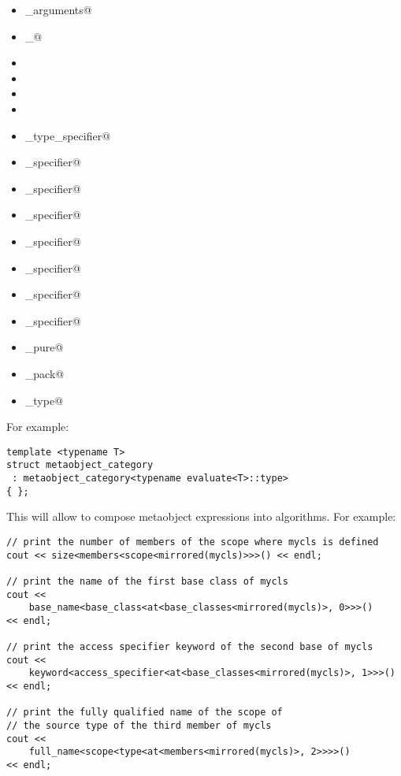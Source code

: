 \begin{minipage}[t]{0.5\textwidth}
\begin{itemize}
\item \verb@template_arguments@
\item \verb@template_@
\item \verb@exceptions@
\item \verb@instantiation@
\item \verb@position@
\item \verb@value@
\item \verb@elaborated_type_specifier@
\item \verb@access_specifier@
\item \verb@constexpr_specifier@
\item \verb@noexcept_specifier@
\item \verb@const_specifier@
\item \verb@inheritance_specifier@
\item \verb@linkage_specifier@
\item \verb@storage_specifier@
\item \verb@is_pure@
\item \verb@is_pack@
\item \verb@original_type@
\end{itemize}
\end{minipage}

For example:

\begin{verbatim}
template <typename T>
struct metaobject_category
 : metaobject_category<typename evaluate<T>::type>
{ };
\end{verbatim}

This will allow to compose metaobject expressions into algorithms. For example:

\begin{verbatim}
// print the number of members of the scope where mycls is defined
cout << size<members<scope<mirrored(mycls)>>>() << endl;

// print the name of the first base class of mycls
cout <<
	base_name<base_class<at<base_classes<mirrored(mycls)>, 0>>>()
<< endl;

// print the access specifier keyword of the second base of mycls
cout <<
	keyword<access_specifier<at<base_classes<mirrored(mycls)>, 1>>>()
<< endl;

// print the fully qualified name of the scope of
// the source type of the third member of mycls
cout <<
	full_name<scope<type<at<members<mirrored(mycls)>, 2>>>>()
<< endl;
\end{verbatim}

